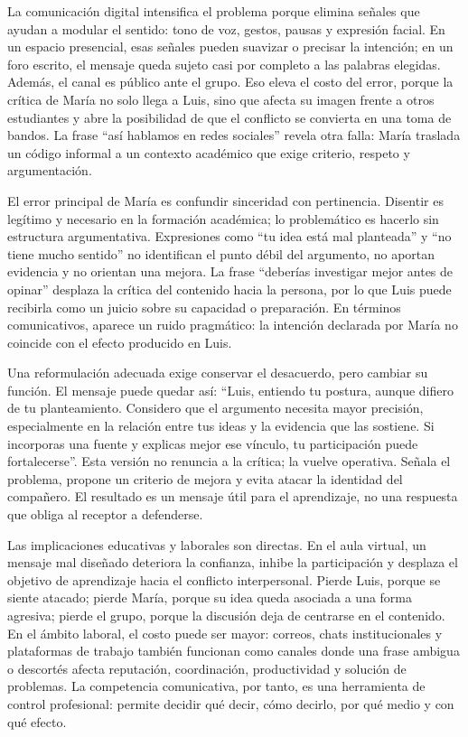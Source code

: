 \documentclass[
	spanish, %
	letterpaper, oneside
]{article}
\begin{document}
La comunicación digital intensifica el problema porque elimina señales que ayudan a modular el sentido: tono de voz, gestos, pausas y expresión facial. En un espacio presencial, esas señales pueden suavizar o precisar la intención; en un foro escrito, el mensaje queda sujeto casi por completo a las palabras elegidas. Además, el canal es público ante el grupo. Eso eleva el costo del error, porque la crítica de María no solo llega a Luis, sino que afecta su imagen frente a otros estudiantes y abre la posibilidad de que el conflicto se convierta en una toma de bandos. La frase ``así hablamos en redes sociales'' revela otra falla: María traslada un código informal a un contexto académico que exige criterio, respeto y argumentación.

El error principal de María es confundir sinceridad con pertinencia. Disentir es legítimo y necesario en la formación académica; lo problemático es hacerlo sin estructura argumentativa. Expresiones como ``tu idea está mal planteada'' y ``no tiene mucho sentido'' no identifican el punto débil del argumento, no aportan evidencia y no orientan una mejora. La frase ``deberías investigar mejor antes de opinar'' desplaza la crítica del contenido hacia la persona, por lo que Luis puede recibirla como un juicio sobre su capacidad o preparación. En términos comunicativos, aparece un ruido pragmático: la intención declarada por María no coincide con el efecto producido en Luis.

Una reformulación adecuada exige conservar el desacuerdo, pero cambiar su función. El mensaje puede quedar así: ``Luis, entiendo tu postura, aunque difiero de tu planteamiento. Considero que el argumento necesita mayor precisión, especialmente en la relación entre tus ideas y la evidencia que las sostiene. Si incorporas una fuente y explicas mejor ese vínculo, tu participación puede fortalecerse''. Esta versión no renuncia a la crítica; la vuelve operativa. Señala el problema, propone un criterio de mejora y evita atacar la identidad del compañero. El resultado es un mensaje útil para el aprendizaje, no una respuesta que obliga al receptor a defenderse.

Las implicaciones educativas y laborales son directas. En el aula virtual, un mensaje mal diseñado deteriora la confianza, inhibe la participación y desplaza el objetivo de aprendizaje hacia el conflicto interpersonal. Pierde Luis, porque se siente atacado; pierde María, porque su idea queda asociada a una forma agresiva; pierde el grupo, porque la discusión deja de centrarse en el contenido. En el ámbito laboral, el costo puede ser mayor: correos, chats institucionales y plataformas de trabajo también funcionan como canales donde una frase ambigua o descortés afecta reputación, coordinación, productividad y solución de problemas. La competencia comunicativa, por tanto, es una herramienta de control profesional: permite decidir qué decir, cómo decirlo, por qué medio y con qué efecto.
\end{document}

